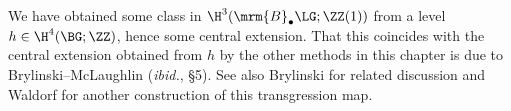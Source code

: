 We have obtained some class in $\H^3(\mrm{B}_\bullet\LG;\ZZ(1))$ from a level $h\in \H^4(\BG;\ZZ)$, hence some
central extension. That this coincides with the central extension obtained from $h$ by the other methods in this
chapter is due to Brylinski--McLaughlin (\textit{ibid.}, \S 5). See also Brylinski \cite[\S 6.5]{Bry08} for related
discussion and Waldorf \cite[\S 3.1]{Wal10} for another construction of this transgression map.


